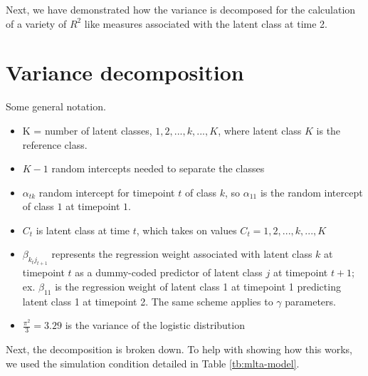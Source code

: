 \documentclass[12pt]{article}
\begin{document}
Next, we have demonstrated how the variance is decomposed for the calculation of a variety of $R^2$ like measures associated with the latent class at time 2.

\section{Variance decomposition}

Some general notation.

\begin{itemize}
\item K = number of latent classes, $1, 2,..., k, ..., K$, where latent class $K$ is the reference class.
\item $K-1$ random intercepts needed to separate the classes
\item $\alpha_{tk}$ random intercept for timepoint $t$ of class $k$, so $\alpha_{11}$ is the random intercept of class $1$ at timepoint $1$.
\item $C_t$ is latent class at time $t$, which takes on values $C_t = 1, 2, ..., k, ..., K$
\item $\beta_{k_{t} j_{t+1}}$ represents the regression weight associated with latent class $k$ at timepoint $t$ as a dummy-coded predictor of latent class $j$ at timepoint $t+1$; ex. $\beta_{11}$ is the regression weight of latent class 1 at timepoint 1 predicting latent class 1 at timepoint 2. The same scheme applies to $\gamma$ parameters.
\item $\frac{\pi^2}{3} = 3.29$ is the variance of the logistic distribution
\end{itemize}

Next, the decomposition is broken down. To help with showing how this works, we used the simulation condition detailed in Table \ref{tb:mlta-model}.
\end{document}
